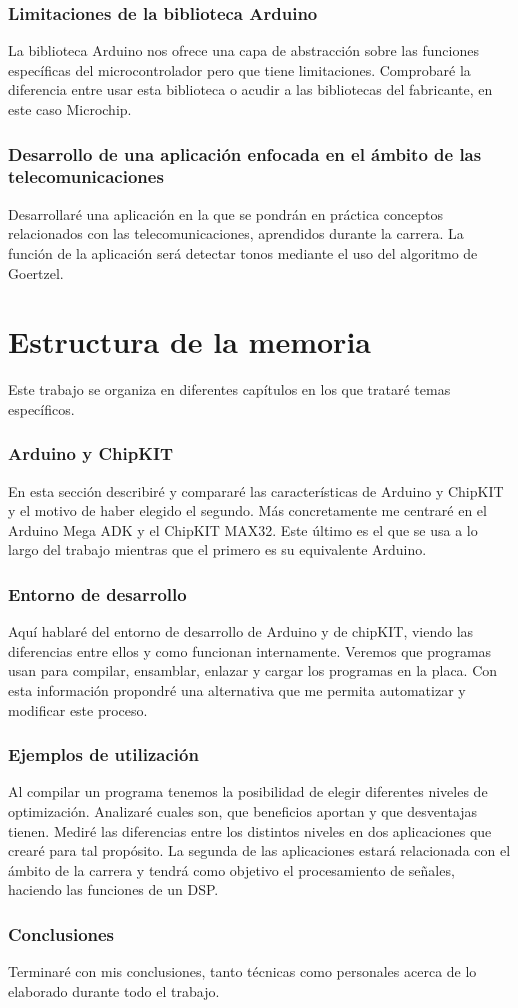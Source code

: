 \subsubsection{Limitaciones de la biblioteca Arduino}
La biblioteca Arduino nos ofrece una capa de abstracción sobre las funciones específicas del microcontrolador pero que tiene limitaciones. Comprobaré la diferencia entre usar esta biblioteca o acudir a las bibliotecas del fabricante, en este caso Microchip.

\subsubsection{Desarrollo de una aplicación enfocada en el ámbito de las telecomunicaciones}
Desarrollaré una aplicación en la que se pondrán en práctica conceptos relacionados con las telecomunicaciones, aprendidos durante la carrera. La función de la aplicación será detectar tonos mediante el uso del algoritmo de Goertzel.


\section{Estructura de la memoria}
Este trabajo se organiza en diferentes capítulos en los que trataré temas específicos.

\subsubsection{Arduino y ChipKIT}
En esta sección describiré y compararé las características de Arduino y ChipKIT y el motivo de haber elegido el segundo. Más concretamente me centraré en el Arduino Mega ADK y el ChipKIT MAX32. Este último es el que se usa a lo largo del trabajo mientras que el primero es su equivalente Arduino.

\subsubsection{Entorno de desarrollo}
Aquí hablaré del entorno de desarrollo de Arduino y de chipKIT, viendo las diferencias entre ellos y como funcionan internamente. Veremos que programas usan para compilar, ensamblar, enlazar y cargar los programas en la placa. Con esta información propondré una alternativa que me permita automatizar y modificar este proceso.

\subsubsection{Ejemplos de utilización}
Al compilar un programa tenemos la posibilidad de elegir diferentes niveles de optimización. Analizaré cuales son, que beneficios aportan y que desventajas tienen. Mediré las diferencias entre los distintos niveles en dos aplicaciones que crearé para tal propósito. La segunda de las aplicaciones estará relacionada con el ámbito de la carrera y tendrá como objetivo el procesamiento de señales, haciendo las funciones de un DSP.

\subsubsection{Conclusiones}
Terminaré con mis conclusiones, tanto técnicas como personales acerca de lo elaborado durante todo el trabajo.